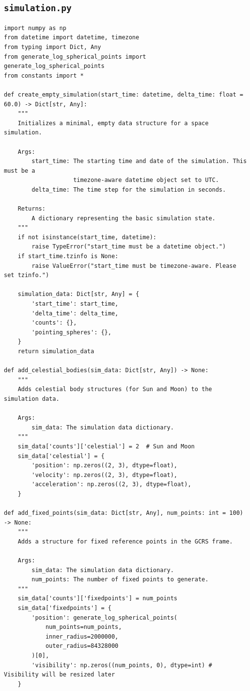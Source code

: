 \documentclass[11pt]{article}
\begin{document}
\subsection{\texttt{simulation.py}}
\begin{Verbatim}
import numpy as np
from datetime import datetime, timezone
from typing import Dict, Any
from generate_log_spherical_points import generate_log_spherical_points
from constants import *

def create_empty_simulation(start_time: datetime, delta_time: float = 60.0) -> Dict[str, Any]:
    """
    Initializes a minimal, empty data structure for a space simulation.

    Args:
        start_time: The starting time and date of the simulation. This must be a
                    timezone-aware datetime object set to UTC.
        delta_time: The time step for the simulation in seconds.

    Returns:
        A dictionary representing the basic simulation state.
    """
    if not isinstance(start_time, datetime):
        raise TypeError("start_time must be a datetime object.")
    if start_time.tzinfo is None:
        raise ValueError("start_time must be timezone-aware. Please set tzinfo.")

    simulation_data: Dict[str, Any] = {
        'start_time': start_time,
        'delta_time': delta_time,
        'counts': {},
        'pointing_spheres': {},
    }
    return simulation_data

def add_celestial_bodies(sim_data: Dict[str, Any]) -> None:
    """
    Adds celestial body structures (for Sun and Moon) to the simulation data.

    Args:
        sim_data: The simulation data dictionary.
    """
    sim_data['counts']['celestial'] = 2  # Sun and Moon
    sim_data['celestial'] = {
        'position': np.zeros((2, 3), dtype=float),
        'velocity': np.zeros((2, 3), dtype=float),
        'acceleration': np.zeros((2, 3), dtype=float),
    }

def add_fixed_points(sim_data: Dict[str, Any], num_points: int = 100) -> None:
    """
    Adds a structure for fixed reference points in the GCRS frame.

    Args:
        sim_data: The simulation data dictionary.
        num_points: The number of fixed points to generate.
    """
    sim_data['counts']['fixedpoints'] = num_points
    sim_data['fixedpoints'] = {
        'position': generate_log_spherical_points(
            num_points=num_points,
            inner_radius=2000000,
            outer_radius=84328000
        )[0],
        'visibility': np.zeros((num_points, 0), dtype=int) # Visibility will be resized later
    }
\end{Verbatim}
\end{document}
